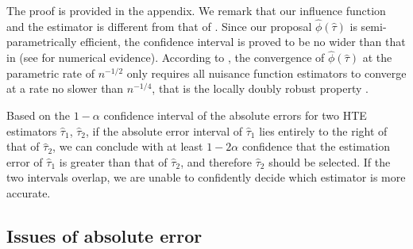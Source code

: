 \documentclass{article}
\theoremstyle{plain}
\theoremstyle{definition}
\theoremstyle{plain}
\begin{document}
The proof is provided in the appendix.
We remark that our influence function and the estimator is different from that of \cite[Theorem 2]{alaa2019validating}.
Since our proposal $\hat{\phi}(\hat{\tau})$ is semi-parametrically efficient, the confidence interval is proved to be no wider than that in \cite{alaa2019validating} (see  for numerical evidence).
According to , the convergence of $\hat{\phi}(\hat{\tau})$ at the parametric rate of $ n^{-1/2} $ only requires all nuisance function estimators to converge at a rate no slower than $ n^{-1/4}$, that is the locally doubly robust property \parencite{chernozhukov2018double}.


Based on the $1-\alpha$ confidence interval of the absolute errors for two HTE estimators $\hat{\tau}_1$, $\hat{\tau}_2$, if the absolute error interval of $\hat{\tau}_1$ lies entirely to the right of that of $\hat{\tau}_2$, we can conclude with at least $1-2\alpha$ confidence that the estimation error of $\hat{\tau}_1$ is greater than that of $\hat{\tau}_2$, and therefore $\hat{\tau}_2$ should be selected. 
If the two intervals overlap, we are unable to confidently decide which estimator is more accurate.


\subsection{Issues of absolute error}\label{sec:absolute.error.issue}
\end{document}
